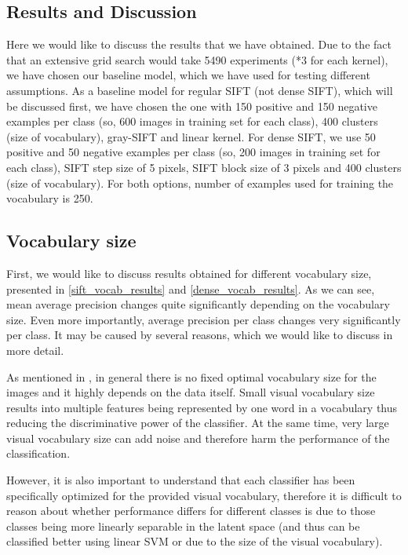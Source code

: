 \documentclass{article}
\begin{document}
\subsection{Results and Discussion}

Here we would like to discuss the results that we have obtained. Due to the fact that an extensive grid search would take 5490 experiments (*3 for each kernel), we have chosen our baseline model, which we have used for testing different assumptions. As a baseline model for regular SIFT (not dense SIFT), which will be discussed first, we have chosen the one with 150 positive and 150 negative examples per class (so, 600 images in training set for each class), 400 clusters (size of vocabulary), gray-SIFT and linear kernel. For dense SIFT, we use 50 positive and 50 negative examples per class (so, 200 images in training set for each class), SIFT step size of 5 pixels, SIFT block size of 3 pixels and 400 clusters (size of vocabulary). For both options, number of examples used for training the vocabulary is 250.

\subsection{Vocabulary size}

First, we would like to discuss results obtained for different vocabulary size, presented in \cref{sift_vocab_results} and \cref{dense_vocab_results}. As we can see, mean average precision changes quite significantly depending on the vocabulary size. Even more importantly, average precision per class changes very significantly per class. It may be caused by several reasons, which we would like to discuss in more detail. 

As mentioned in \cite{visual_vocabulary_size}, in general there is no fixed optimal vocabulary size for the images and it highly depends on the data itself. Small visual vocabulary size results into multiple features being represented by one word in a vocabulary thus reducing the discriminative power of the classifier. At the same time, very large visual vocabulary size can add noise and therefore harm the performance of the classification. 

However, it is also important to understand that each classifier has been specifically optimized for the provided visual vocabulary, therefore it is difficult to reason about whether performance differs for different classes is due to those classes being more linearly separable in the latent space (and thus can be classified better using linear SVM or due to the size of the visual vocabulary). 
\end{document}
